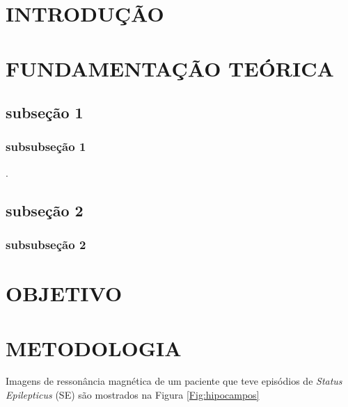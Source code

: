 \documentclass[a4paper, 12pt]{article}
\begin{document}
\section{INTRODUÇÃO}

\Blindtext

\newpage
\section{FUNDAMENTAÇÃO TEÓRICA}

\blindtext[5]

\subsection{subseção 1}

\Blindtext \cite{Haacke:1999, Landini:2005, Lauterbur:1973, Polli:2010}

\subsubsection{subsubseção 1}

\Blindtext \cite{Bloch:1946, Graaf:2001}.

\subsection{subseção 2}

\blindtext[5]

\subsubsection{subsubseção 2}

\blindtext[5]

\newpage
\section{OBJETIVO}

\blindtext \cite{Atkins:2012, Gonzalez:2007}

\newpage
\section{METODOLOGIA}

\blindtext

Imagens de ressonância magnética de um paciente que teve episódios de \textit{Status Epilepticus} (SE) são mostrados na Figura \ref{Fig:hipocampos}
\end{document}

